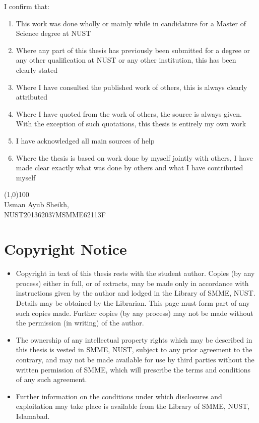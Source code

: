 \documentclass[11pt,a4paper]{report}
\numberwithin{equation}{section}
\begin{document}
    I confirm that:
    \begin{enumerate}
        \item This work was done wholly or mainly while in candidature for a Master of Science degree at NUST
        \item Where any part of this thesis has previously been submitted for a degree or any other qualification at NUST or any other institution, this has been clearly stated
        \item Where I have consulted the published work of others, this is always clearly attributed
        \item Where I have quoted from the work of others, the source is always given. With the exception of such quotations, this thesis is entirely my own work
        \item I have acknowledged all main sources of help
        \item Where the thesis is based on work done by myself jointly with others, I have made clear exactly what was done by others and what I have contributed myself
    \end{enumerate}

    \begin{flushright}
        \line(1,0){100} \\
        Usman Ayub Sheikh, \\
        NUST201362037MSMME62113F
    \end{flushright}

    \newpage
    \chapter*{Copyright Notice} %
    \label{cha:copyright_notice}
    \begin{itemize}
        \item Copyright in text of this thesis rests with the student author. Copies (by any process) either in full, or of extracts, may be made only in accordance with instructions given by the author and lodged in the Library of SMME, NUST. Details may be obtained by the Librarian. This page must form part of any such copies made. Further copies (by any process) may not be made without the permission (in writing) of the author.
        \item The ownership of any intellectual property rights which may be described in this thesis is vested in SMME, NUST, subject to any prior agreement to the contrary, and may not be made available for use by third parties without the written permission of SMME, which will prescribe the terms and conditions of any such agreement.
        \item Further information on the conditions under which disclosures and exploitation may take place is available from the Library of SMME, NUST, Islamabad.
    \end{itemize}
\end{document}
